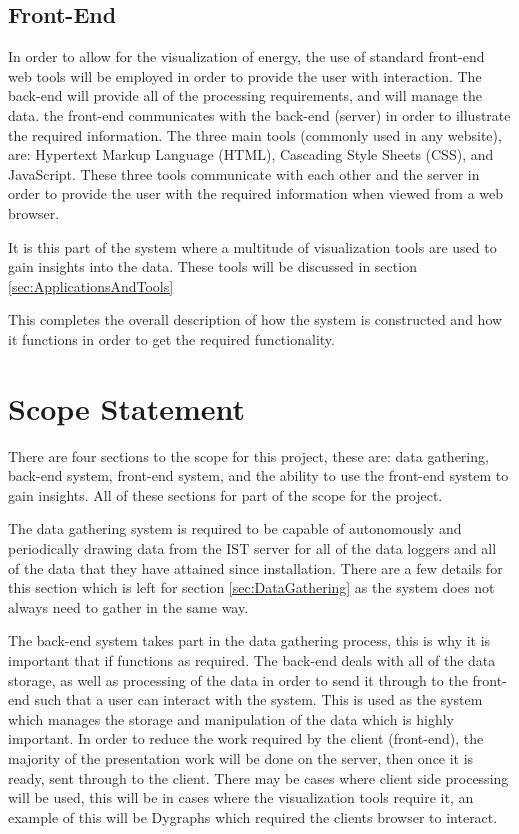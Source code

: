 \documentclass[12pt,onecolumn]{IEEEtran}
\begin{document}
\subsection{Front-End} \label{sec:FrontEnd}
In order to allow for the visualization of energy, the use of standard front-end web tools will be employed in order to provide the user with interaction. 
The back-end will provide all of the processing requirements, and will manage the data. the front-end communicates with the back-end (server) in order to illustrate the required information.
The three main tools (commonly used in any website), are: Hypertext Markup Language (HTML), Cascading Style Sheets (CSS), and JavaScript. 
These three tools communicate with each other and the server in order to provide the user with the required information when viewed from a web browser. 

It is this part of the system where a multitude of visualization tools are used to gain insights into the data. These tools will be discussed in section \ref{sec:ApplicationsAndTools}

This completes the overall description of how the system is constructed and how it functions in order to get the required functionality.


\section{Scope Statement} \label{sec:ScopeStatement}
There are four sections to the scope for this project, these are: data gathering, back-end system, front-end system, and the ability to use the front-end system to gain insights. All of these sections for part of the scope for the project. 

The data gathering system is required to be capable of autonomously and periodically drawing data from the IST server for all of the data loggers and all of the data that they have attained since installation. There are a few details for this section which is left for section \ref{sec:DataGathering} as the system does not always need to gather in the same way.

The back-end system takes part in the data gathering process, this is why it is important that if functions as required. The back-end deals with all of the data storage, as well as processing of the data in order to send it through to the front-end such that a user can interact with the system. This is used as the system which manages the storage and manipulation of the data which is highly important. 
In order to reduce the work required by the client (front-end), the majority of the presentation work will be done on the server, then once it is ready, sent through to the client. 
There may be cases where client side processing will be used, this will be in cases where the visualization tools require it, an example of this will be Dygraphs which required the clients browser to interact.
\end{document}
